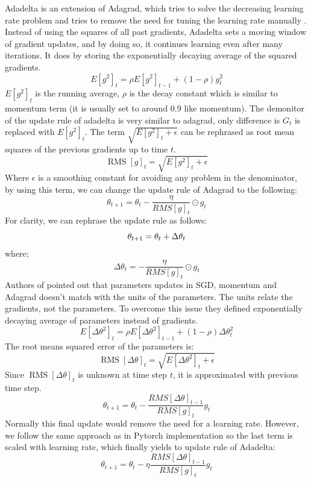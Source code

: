 \documentclass[a4paper, nobind]{templates/ociamthesis}
\begin{document}
\noindent Adadelta is an extension of Adagrad, which tries to solve the decreasing learning rate problem and tries to remove the need for tuning the learning rate manually \cite{zeiler2012adadelta}. Instead of using the squares of all past gradients, Adadelta sets a moving window of gradient updates, and by doing so, it continues learning even after many iterations. It does by storing the exponentially decaying average of the squared gradients.
\[
E\left[g^{2}\right]_{t}=\rho E\left[g^{2}\right]_{t-1}+(1-\rho) g_{t}^{2}
\]
\(E\left[g^{2}\right]_{t}\) is the running average, \(\rho\) is the decay constant which is similar to momentum term (it is usually set to around \(0.9\) like momentum). The demonitor of the update rule of adadelta is very similar to adagrad, only difference is \(G_{t}\) is replaced with \(E\left[g^{2}\right]_{t}\). The term \(\sqrt{E\left[g^{2}\right]_{t}+\epsilon}\) can be rephrased as root mean squares of the previous gradients up to time \(t\).
\[
\operatorname{RMS}[g]_{t}=\sqrt{E\left[g^{2}\right]_{t}+\epsilon}
\]
Where \(\epsilon\) is a smoothing constant for avoiding any problem in the denominator, by using this term, we can change the update rule of Adagrad to the following:
\[
\theta_{t+1}=\theta_{t}-\frac{\eta}{R M S[g]_{t}} \odot g_{t}
\]
For clarity, we can rephrase the update rule as follows:
\[
\theta_{t+1} = \theta_{t} + \Delta \theta_{t} \\
\]
where;
\[\Delta \theta_{t} = -\frac{\eta}{R M S[g]_{t}} \odot g_{t}\]
Authors of \cite{zeiler2012adadelta} pointed out that parameters updates in SGD, momentum and Adagrad doesn't match with the units of the parameters. The units relate the gradients, not the parameters. To overcome this issue they defined exponentially decaying average of parameters instead of gradients.
\[
E\left[\Delta \theta^{2}\right]_{t}=\rho E\left[\Delta \theta^{2}\right]_{t-1}+(1-\rho) \Delta \theta_{t}^{2}
\]
The root means squared error of the parameters is:
\[
\operatorname{RMS}[\Delta \theta]_{t}=\sqrt{E\left[\Delta \theta^{2}\right]_{t}+\epsilon}
\]
Since \(\operatorname{RMS}[\Delta \theta]_{t}\) is unknown at time step \(t\), it is approximated with previous time step.
\[
\theta_{t+1}=\theta_{t} - \frac{R M S[\Delta \theta]_{t-1}}{R M S[g]_{t}} g_{t}
\]
Normally this final update would remove the need for a learning rate. However, we follow the same approach as in Pytorch implementation \cite{NEURIPS2019_9015} so the last term is scaled with learning rate, which finally yields to update rule of Adadelta:
\[
\theta_{t+1}=\theta_{t} - \eta \frac{R M S[\Delta \theta]_{t-1}}{R M S[g]_{t}} g_{t}
\]
\end{document}

